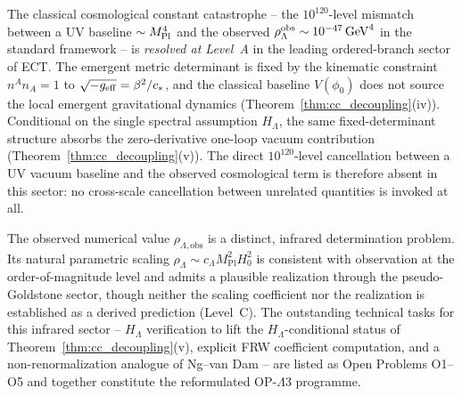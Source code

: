The classical cosmological constant catastrophe -- the
$10^{120}$-level mismatch between a UV baseline $\sim M_{\rm Pl}^4$
and the observed $\rho_\Lambda^{\rm obs}\sim 10^{-47}\,\mathrm{GeV}^4$
in the standard framework -- is \emph{resolved at Level~A} in the
leading ordered-branch sector of ECT. The emergent metric
determinant is fixed by the kinematic constraint $n^A n_A = 1$ to
$\sqrt{-g_{\rm eff}} = \beta^2/c_*$, and the classical baseline
$V(\phi_0)$ does not source the local emergent gravitational
dynamics (Theorem~\ref{thm:cc_decoupling}(iv)). Conditional on the single spectral
assumption $H_\Lambda$, the same fixed-determinant structure absorbs the
zero-derivative one-loop vacuum contribution (Theorem~\ref{thm:cc_decoupling}(v)). The
direct $10^{120}$-level cancellation between a UV vacuum baseline
and the observed cosmological term is therefore absent in this
sector: no cross-scale cancellation between unrelated quantities is
invoked at all.

The observed numerical value $\rho_{\Lambda,\mathrm{obs}}$ is a
distinct, infrared determination problem. Its natural parametric
scaling $\rho_\Lambda \sim c_\Lambda M_{\mathrm{Pl}}^2 H_0^2$ is
consistent with observation at the order-of-magnitude level and
admits a plausible realization through the pseudo-Goldstone sector,
though neither the scaling coefficient nor the realization is
established as a derived prediction (Level~C). The outstanding
technical tasks for this infrared sector -- $H_\Lambda$ verification to lift
the $H_\Lambda$-conditional status of Theorem~\ref{thm:cc_decoupling}(v), explicit FRW coefficient
computation, and a non-renormalization analogue of Ng--van Dam --
are listed as Open Problems O1--O5 and together constitute the
reformulated OP-$\Lambda$3 programme.


